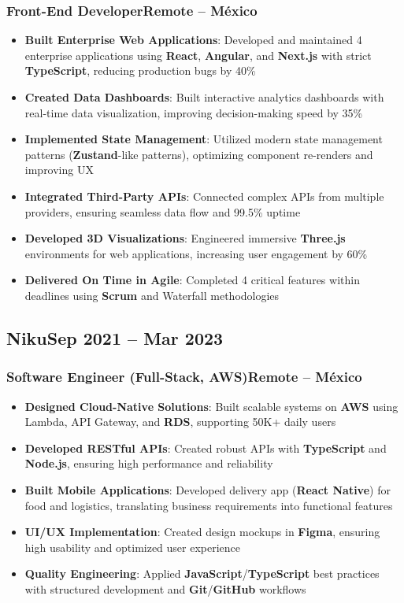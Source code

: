 \documentclass[a4paper,10pt]{article}
\newcommand{\kw}[1]{\textbf{\textcolor{keyword}{#1}}}
\newcommand{\tech}[1]{\textbf{\textcolor{tech}{#1}}}
\begin{document}
\subsubsection*{Front-End Developer\hfill Remote -- México}
\begin{itemize}[noitemsep, leftmargin=*]
    \item \textbf{Built Enterprise Web Applications}: Developed and maintained 4 enterprise applications using \tech{React}, \tech{Angular}, and \tech{Next.js} with strict \tech{TypeScript}, reducing production bugs by 40\%
    \item \textbf{Created Data Dashboards}: Built interactive analytics dashboards with real-time data visualization, improving decision-making speed by 35\%
    \item \textbf{Implemented State Management}: Utilized modern state management patterns (\tech{Zustand}-like patterns), optimizing component re-renders and improving UX
    \item \textbf{Integrated Third-Party APIs}: Connected complex APIs from multiple providers, ensuring seamless data flow and 99.5\% uptime
    \item \textbf{Developed 3D Visualizations}: Engineered immersive \tech{Three.js} environments for web applications, increasing user engagement by 60\%
    \item \textbf{Delivered On Time in Agile}: Completed 4 critical features within deadlines using \kw{Scrum} and Waterfall methodologies
\end{itemize}

\subsection*{Niku\hfill\textbf{Sep 2021 -- Mar 2023}}
\subsubsection*{Software Engineer (Full-Stack, AWS)\hfill Remote -- México}
\begin{itemize}[noitemsep, leftmargin=*]
    \item \textbf{Designed Cloud-Native Solutions}: Built scalable systems on \tech{AWS} using Lambda, API Gateway, and \tech{RDS}, supporting 50K+ daily users
    \item \textbf{Developed RESTful APIs}: Created robust APIs with \tech{TypeScript} and \tech{Node.js}, ensuring high performance and reliability
    \item \textbf{Built Mobile Applications}: Developed delivery app (\tech{React Native}) for food and logistics, translating business requirements into functional features
    \item \textbf{UI/UX Implementation}: Created design mockups in \tech{Figma}, ensuring high usability and optimized user experience
    \item \textbf{Quality Engineering}: Applied \tech{JavaScript}/\tech{TypeScript} best practices with structured development and \tech{Git}/\tech{GitHub} workflows
\end{itemize}
\end{document}
